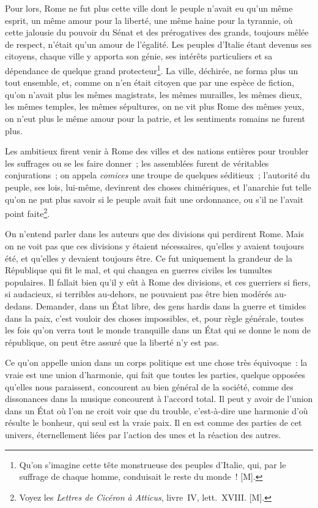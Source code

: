 \documentclass[french,twoside]{book} %
\begin{document}
Pour lors, Rome ne fut plus cette ville dont le peuple n’avait eu qu’un même esprit, un même amour pour la liberté, une même haine pour la tyrannie, où cette jalousie du pouvoir du Sénat et des prérogatives des grands, toujours mêlée de respect, n’était qu’un amour de l’égalité. Les peuples d’Italie étant devenus ses citoyens, chaque ville y apporta son génie, ses intérêts particuliers et sa dépendance de quelque grand protecteur\footnote{Qu’on s’imagine cette tête monstrueuse des peuples d’Italie, qui, par le suffrage de chaque homme, conduisait le reste du monde ! [M].}. La ville, déchirée, ne forma plus un tout ensemble, et, comme on n’en était citoyen que par une espèce de fiction, qu’on n’avait plus les mêmes magistrats, les mêmes murailles, les mêmes dieux, les mêmes temples, les mêmes sépultures, on ne vit plus Rome des mêmes yeux, on n’eut plus le même amour pour la patrie, et les sentiments romains ne furent plus.\par
Les ambitieux firent venir à Rome des villes et des nations entières pour troubler les suffrages ou se les faire donner ; les assemblées furent de véritables conjurations ; on appela {\itshape comices} une troupe de quelques séditieux ; l’autorité du peuple, ses lois, lui-même, devinrent des choses chimériques, et l’anarchie fut telle qu’on ne put plus savoir si le peuple avait fait une ordonnance, ou s’il ne l’avait point faite\footnote{Voyez les {\itshape Lettres de Cicéron à Atticus}, livre IV, lett. XVIII. [M].}.\par
On n’entend parler dans les auteurs que des divisions qui perdirent Rome. Mais on ne voit pas que ces divisions y étaient nécessaires, qu’elles y avaient toujours été, et qu’elles y devaient toujours être. Ce fut uniquement la grandeur de la République qui fit le mal, et qui changea en guerres civiles les tumultes populaires. Il fallait bien qu’il y eût à Rome des divisions, et ces guerriers si fiers, si audacieux, si terribles au-dehors, ne pouvaient pas être bien modérés au-dedans. Demander, dans un État libre, des gens hardis dans la guerre et timides dans la paix, c’est vouloir des choses impossibles, et, pour règle générale, toutes les fois qu’on verra tout le monde tranquille dans un État qui se donne le nom de république, on peut être assuré que la liberté n’y est pas.\par
Ce qu’on appelle union dans un corps politique est une chose très équivoque : la vraie est une union d’harmonie, qui fait que toutes les parties, quelque opposées qu’elles nous paraissent, concourent au bien général de la société, comme des dissonances dans la musique concourent à l’accord total. Il peut y avoir de l’union dans un État où l’on ne croit voir que du trouble, c’est-à-dire une harmonie d’où résulte le bonheur, qui seul est la vraie paix. Il en est comme des parties de cet univers, éternellement liées par l’action des unes et la réaction des autres.\par
\end{document}
